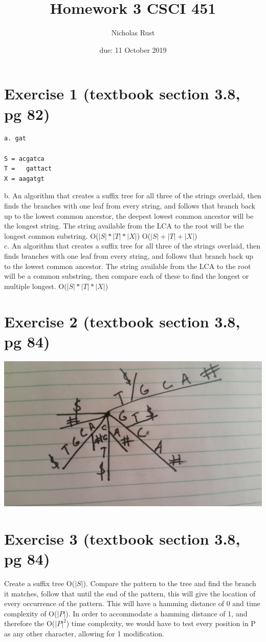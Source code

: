 \documentclass{article}
\title{Homework 3 CSCI 451}
\author{Nicholas Rust}
\date{due: 11 October 2019}
\begin{document}
\maketitle

\section{Exercise 1 (textbook section 3.8, pg 82)}
\begin{verbatim}
a. gat
		
S = acgatca
T =   gattact
X = aagatgt
\end{verbatim}
b. An algorithm that creates a suffix tree for all three of the strings overlaid, then finds the branches with one leaf from every string, and follows that branch back up to the lowest common ancestor, the deepest lowest common ancestor will be the longest string. The string available from the LCA to the root will be the longest common substring. O($|S| * |T| * |X|$) O($|S| + |T| + |X|$)\\
c.  An algorithm that creates a suffix tree for all three of the strings overlaid, then finds branches with one leaf from every string, and follows that branch back up to the lowest common ancestor. The string available from the LCA to the root will be a common substring, then compare each of these to find the longest or multiple longest. O($|S| * |T| * |X|$)

\section{Exercise 2 (textbook section 3.8, pg 84)}
\includegraphics[width=1.75\textwidth,center]{problem2.jpg}

\section{Exercise 3 (textbook section 3.8, pg 84)}
Create a suffix tree O($|S|$). Compare the pattern to the tree and find the branch it matches, follow that until the end of the pattern, this will give the location of every occurrence of the pattern. This will have a hamming distance of 0 and time complexity of O($|P|$). In order to accommodate a hamming distance of 1, and therefore the O($|P|^2$) time complexity, we would have to test every position in P as any other character, allowing for 1 modification.
\end{document}
